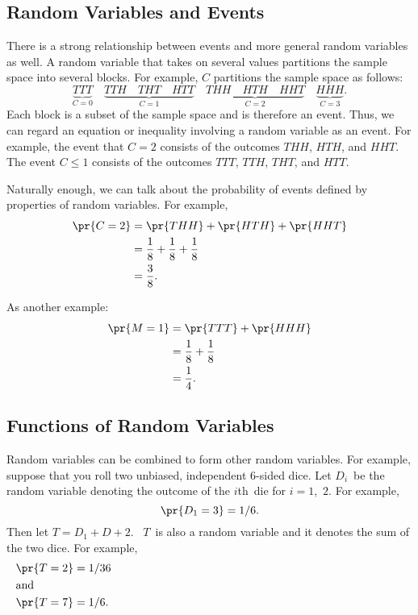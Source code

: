 \subsection{Random Variables and Events}

There is a strong relationship between events and more general random
variables as well.  A random variable that takes on several values
partitions the sample space into several blocks.  For example, $C$
partitions the sample space as follows:
\[
\underbrace{TTT}_{\text{$C = 0$}} \quad
\underbrace{TTH \quad THT \quad HTT}_{\text{$C = 1$}} \quad
\underbrace{THH \quad HTH \quad HHT}_{\text{$C = 2$}} \quad
\underbrace{HHH}_{\text{$C = 3$}}.
\]
Each block is a subset of the sample space and is therefore
an event.  Thus, we can regard an equation or inequality involving a
random variable as an event.  For example, the event that $C = 2$
consists of the outcomes $THH$, $HTH$, and $HHT$.  The event $C \leq
1$ consists of the outcomes $TTT$, $TTH$, $THT$, and $HTT$.

Naturally enough, we can talk about the probability of events defined
by properties of random variables.  For example,
\begingroup
{}
\begin{align*}
\pr{C = 2}
        &=    \pr{THH} + \pr{HTH} + \pr{HHT} \\
        &=    \frac{1}{8} + \frac{1}{8} + \frac{1}{8} \\
        &=  \frac{3}{8}.
\end{align*}
\endgroup

As another example:
\begingroup{}
\begin{align*}
\pr{M = 1}
        &= \pr{TTT} + \pr{HHH}\\
        &= \frac{1}{8} + \frac{1}{8} \\
        &= \frac{1}{4}.
\end{align*}
\endgroup

\subsection{Functions of Random Variables}

Random variables can be combined to form other random variables.  For
example, suppose that you roll two unbiased, independent 6-sided
dice.  Let $D_i$~be the random variable denoting the outcome of the
$i$th~die for $i = 1$,~$2$.  For example,
\begin{equation*}
    \pr{D_1 = 3} = 1/6.
\end{equation*}
Then let $T = D_1 + D+2$. \ $T$~is also a random variable and it
denotes the sum of the two dice.  For example,
\begin{align*}
    \pr{T = 2} &= 1/36 \\
\noalign{\noindent and}
    \pr{T = 7} &= 1/6.
\end{align*}

